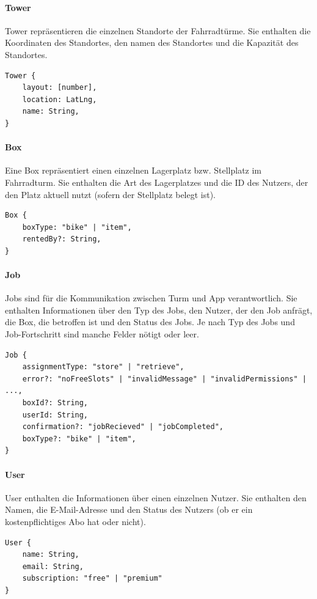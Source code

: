 \paragraph{Tower}
Tower repräsentieren die einzelnen Standorte der Fahrradtürme. Sie enthalten die Koordinaten des Standortes, den namen des Standortes und die Kapazität des Standortes.

\begin{verbatim}
Tower {
    layout: [number],
    location: LatLng,
    name: String,
}
\end{verbatim}

\paragraph{Box}
Eine Box repräsentiert einen einzelnen Lagerplatz bzw. Stellplatz im Fahrradturm. Sie enthalten die Art des Lagerplatzes und die ID des Nutzers, der den Platz aktuell nutzt (sofern der Stellplatz belegt ist).

\begin{verbatim}
Box {
    boxType: "bike" | "item",
    rentedBy?: String,
}
\end{verbatim}


\paragraph{Job}
Jobs sind für die Kommunikation zwischen Turm und App verantwortlich. Sie enthalten Informationen über den Typ des Jobs, den Nutzer, der den Job anfrägt, die Box, die betroffen ist und den Status des Jobs. Je nach Typ des Jobs und Job-Fortschritt sind manche Felder nötigt oder leer.

\begin{verbatim}
Job {
    assignmentType: "store" | "retrieve",
    error?: "noFreeSlots" | "invalidMessage" | "invalidPermissions" | ...,
    boxId?: String,
    userId: String,
    confirmation?: "jobRecieved" | "jobCompleted",
    boxType?: "bike" | "item",
}
\end{verbatim}


\paragraph{User}
User enthalten die Informationen über einen einzelnen Nutzer. Sie enthalten den Namen, die E-Mail-Adresse und den Status des Nutzers (ob er ein kostenpflichtiges Abo hat oder nicht).

\begin{verbatim}
User {
    name: String,
    email: String,
    subscription: "free" | "premium"
}
\end{verbatim}



